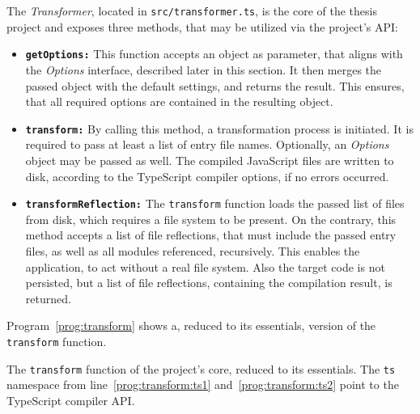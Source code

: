 The \emph{Transformer}, located in \texttt{src/transformer.ts}, is the core of the thesis project and exposes three methods, that may be utilized via the project's API:
\begin{itemize}
  \item \texttt{\textbf{getOptions:}} This function accepts an object as parameter, that aligns with the \emph{Options} interface, described later in this section. It then merges the passed object with the default settings, and returns the result. This ensures, that all required options are contained in the resulting object.
  \item \texttt{\textbf{transform:}} By calling this method, a transformation process is initiated. It is required to pass at least a list of entry file names. Optionally, an \emph{Options} object may be passed as well. The compiled JavaScript files are written to disk, according to the TypeScript compiler options, if no errors occurred.
  \item \texttt{\textbf{transformReflection:}} The \texttt{transform} function loads the passed list of files from disk, which requires a file system to be present. On the contrary, this method accepts a list of file reflections, that must include the passed entry files, as well as all modules referenced, recursively. This enables the application, to act without a real file system. Also the target code is not persisted, but a list of file reflections, containing the compilation result, is returned.
\end{itemize}
Program~\ref{prog:transform} shows a, reduced to its essentials, version of the \texttt{transform} function.
\begin{program}
\caption{The \texttt{transform} function of the project's core, reduced to its essentials. The \texttt{ts} namespace from line~\ref{prog:transform:ts1} and~\ref{prog:transform:ts2} point to the TypeScript compiler API.}
\label{prog:transform}
\begin{JsCode}
function transform(entryFiles: string[], options?: Options} {
  const opts = getOptions(options);
  const program = ts.createProgram(entryFiles, opts.compilerOptions); /+\label{prog:transform:ts1}+/
  const scanner = new Scanner(program, opts);
  const files = program.getSourceFiles();
  const result = ts.transform(files, [transformer], opts.compilerOptions); /+\label{prog:transform:ts2}+/ /+\label{prog:transform:transformer}+/
  emit(result);
}
\end{JsCode}
\end{program}
